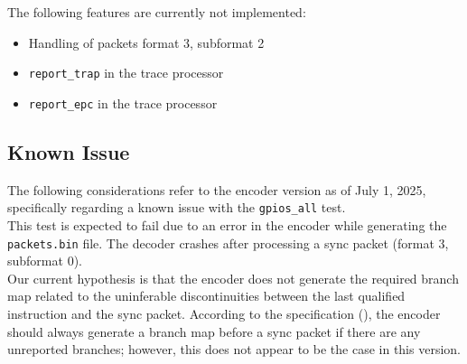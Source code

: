 \documentclass[a4paper,12pt]{article}
\begin{document}
The following features are currently not implemented:

\begin{itemize}
    \item Handling of packets format 3, subformat 2
    \item \texttt{report\_trap} in the trace processor
    \item \texttt{report\_epc} in the trace processor
\end{itemize}

\subsection{Known Issue}
The following considerations refer to the encoder version as of July 1, 2025, specifically regarding a known issue with the \texttt{gpios\_all} test.
\\
This test is expected to fail due to an error in the encoder while generating the \texttt{packets.bin} file. The decoder crashes after processing a sync packet (format 3, subformat 0). 
\\
Our current hypothesis is that the encoder does not generate the required branch map related to the uninferable discontinuities between the last qualified instruction and the sync packet. According to the specification (\cite[Section~9.2]{riscv_trace_spec}), the encoder should always generate a branch map before a sync packet if there are any unreported branches; however, this does not appear to be the case in this version.


\label{Bibliography}


\end{document}
